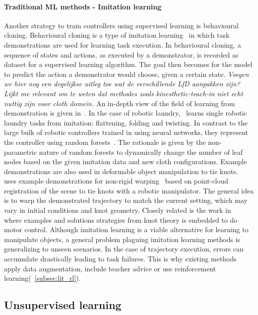 \documentclass[\home/main.tex]{subfiles}
\begin{document}
\paragraph{Traditional ML methods - Imitation learning}
Another strategy to train controllers using supervised learning is behavioural cloning. Behavioural cloning is a type of imitation learning~\autocite{Argall2009} in which task demonstrations are used for learning task execution. In behavioural cloning, a sequence of states and actions, as executed by a demonstrator, is recorded as dataset for a supervised learning algorithm. The goal then becomes for the model to predict the action a demonstrator would choose, given a certain state. \emph{Voegen we hier nog een degelijkse uitleg toe wat de verschillende LfD aanpakken zijn? Lijkt me relevant om te weten dat methodes zoals kinesthetic-teach-in niet echt nuttig zijn voor cloth domein.} An in-depth view of the field of learning from demonstration is given in~\autocite{Argall2009}. In the case of robotic laundry,~\textcite{Jia2019} learns single robotic laundry tasks from imitation: flattening, folding and twisting. In contrast to the large bulk of robotic controllers trained in \citeyear{Jia2019} using neural networks, they represent the controller using random forests~\autocite{Breiman2001}. The rationale is given by the non-parametric nature of random forests to dynamically change the number of leaf nodes based on the given imitation data and new cloth configurations. Example demonstrations are also used in deformable object manipulation to tie knots. ~\textcite{Schulman2016learning} uses example demonstrations for non-rigid warping~\autocite{Chui2003} based on point-cloud registration of the scene to tie knots with a robotic manipulator. The general idea is to warp the demonstrated trajectory to match the current setting, which may vary in initial conditions and knot geometry. Closely related is the work in~\autocite{Morita2003} where examples and solutions strategies from knot theory is embedded to do motor control. Although imitation learning is a viable alternative for learning to manipulate objects, a general problem plaguing imitation learning methods is generalizing to unseen scenarios. In the case of trajectory execution, errors can accumulate drastically leading to task failures. This is why existing methods apply data augmentation, include teacher advice or use reinforcement learning(~\cref{subsec:lit_rl}).

\subsection{Unsupervised learning}
\end{document}
